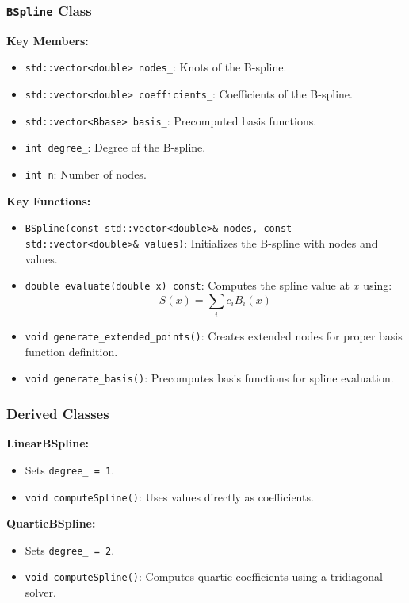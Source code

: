\documentclass[a4paper]{article}
\begin{document}
\subsubsection{\texttt{BSpline} Class}

\textbf{Key Members:}
\begin{itemize}
    \item \texttt{std::vector<double> nodes\_}: Knots of the B-spline.
    \item \texttt{std::vector<double> coefficients\_}: Coefficients of the B-spline.
    \item \texttt{std::vector<Bbase> basis\_}: Precomputed basis functions.
    \item \texttt{int degree\_}: Degree of the B-spline.
    \item \texttt{int n}: Number of nodes.
\end{itemize}

\textbf{Key Functions:}
\begin{itemize}
    \item \texttt{BSpline(const std::vector<double>\& nodes, const std::vector<double>\& values)}:
    Initializes the B-spline with nodes and values.
    \item \texttt{double evaluate(double x) const}:
    Computes the spline value at $x$ using:
    \[
    S(x) = \sum_{i} c_i B_i(x)
    \]
    \item \texttt{void generate\_extended\_points()}:
    Creates extended nodes for proper basis function definition.
    \item \texttt{void generate\_basis()}:
    Precomputes basis functions for spline evaluation.
\end{itemize}

\subsubsection{Derived Classes}

\textbf{LinearBSpline:}
\begin{itemize}
    \item Sets \texttt{degree\_ = 1}.
    \item \texttt{void computeSpline()}:
    Uses values directly as coefficients.
\end{itemize}

\textbf{QuarticBSpline:}
\begin{itemize}
    \item Sets \texttt{degree\_ = 2}.
    \item \texttt{void computeSpline()}:
    Computes quartic coefficients using a tridiagonal solver.
\end{itemize}
\end{document}
